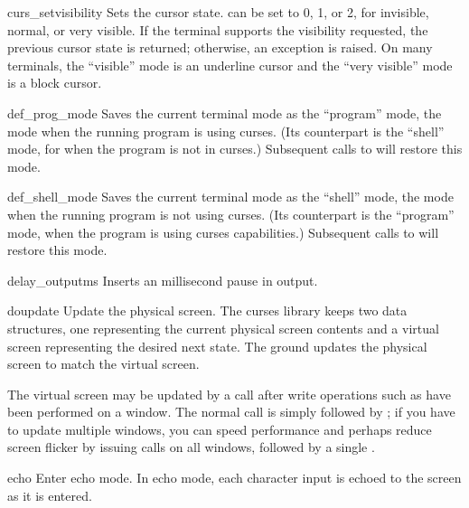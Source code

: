 \begin{funcdesc}{curs_set}{visibility}
Sets the cursor state.   can be set to 0, 1, or 2, for
invisible, normal, or very visible.  If the terminal supports the
visibility requested, the previous cursor state is returned;
otherwise, an exception is raised.  On many terminals, the ``visible''
mode is an underline cursor and the ``very visible'' mode is a block cursor.
\end{funcdesc}

\begin{funcdesc}{def_prog_mode}{}
Saves the current terminal mode as the ``program'' mode, the mode when
the running program is using curses.  (Its counterpart is the
``shell'' mode, for when the program is not in curses.)  Subsequent calls
to  will restore this mode.
\end{funcdesc}

\begin{funcdesc}{def_shell_mode}{}
Saves the current terminal mode as the ``shell'' mode, the mode when
the running program is not using curses.  (Its counterpart is the
``program'' mode, when the program is using curses capabilities.)
Subsequent calls
to  will restore this mode.
\end{funcdesc}

\begin{funcdesc}{delay_output}{ms}
Inserts an  millisecond pause in output.  
\end{funcdesc}

\begin{funcdesc}{doupdate}{}
Update the physical screen.  The curses library keeps two data
structures, one representing the current physical screen contents
and a virtual screen representing the desired next state.  The
 ground updates the physical screen to match the
virtual screen.

The virtual screen may be updated by a  call
after write operations such as  have been performed
on a window.  The normal  call is simply
 followed by ; if you have
to update multiple windows, you can speed performance and perhaps
reduce screen flicker by issuing  calls on
all windows, followed by a single .
\end{funcdesc}

\begin{funcdesc}{echo}{}
Enter echo mode.  In echo mode, each character input is echoed to the
screen as it is entered.  
\end{funcdesc}

